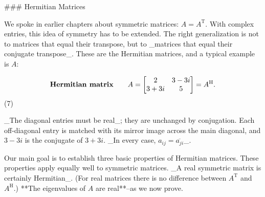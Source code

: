 ### Hermitian Matrices

We spoke in earlier chapters about symmetric matrices: \(A=A^{\text{T}}\). With complex entries, this idea of symmetry has to be extended. The right generalization is not to matrices that equal their transpose, but to _matrices that equal their conjugate transpose_. These are the Hermitian matrices, and a typical example is \(A\):

\[\text{\bf Hermitian matrix}\qquad A=\begin{bmatrix}2&3-3i\\ 3+3i&5\end{bmatrix}=A^{\text{H}}.\] (7)

_The diagonal entries must be real_; they are unchanged by conjugation. Each off-diagonal entry is matched with its mirror image across the main diagonal, and \(3-3i\) is the conjugate of \(3+3i\). _In every case, \(a_{ij}=\overline{a_{ji}}\)_.

Our main goal is to establish three basic properties of Hermitian matrices. These properties apply equally well to symmetric matrices. _A real symmetric matrix is certainly Hermitian_. (For real matrices there is no difference between \(A^{\text{T}}\) and \(A^{\text{H}}\).) **The eigenvalues of \(A\) are real**--as we now prove.

 